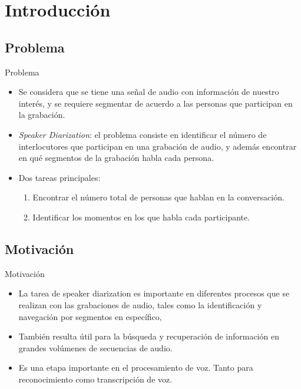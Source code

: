 

\section{Introducción}

\subsection{Problema}
\begin{frame}{Problema}

\begin{itemize}
    \itemsep1em
    \item Se considera que se tiene una señal de audio con información de nuestro interés, y se requiere segmentar de acuerdo a las personas que participan en la grabación.

    \item \textit{Speaker Diarization}: el problema consiste en identificar el número de interlocutores que participan en una grabación de audio, y además encontrar en qué segmentos de la grabación habla cada persona.

    \item Dos tareas principales: 
    \begin{enumerate}
        \item Encontrar el número total de personas que hablan en la conversación.
        \item Identificar los momentos en los que habla cada participante.
    \end{enumerate}
  \end{itemize}

\end{frame}

\subsection{Motivación}

\begin{frame}{Motivación}
  \begin{itemize}
    \itemsep1em
    \item  La tarea de speaker diarization es importante en diferentes procesos que se realizan con las grabaciones de audio, tales como la identificación y navegación por segmentos en específico, 

    \item También resulta útil para la búsqueda y recuperación de información en grandes volúmenes de secuencias de audio.
  
    \item Es una etapa importante en el procesamiento de voz. Tanto para reconocimiento como transcripción de voz.
    
  \end{itemize}
\end{frame}

